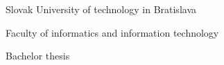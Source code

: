 \begin{center}
\thispagestyle{empty}
{\Large Slovak University of technology in Bratislava}
\par\end{center}{\Large \par}

\begin{center}
{\Large Faculty of informatics and information technology}
\par\end{center}{\Large \par}

\smallskip{}

\begin{center}
\myEvidenceNumber
\par\end{center}
\vfill{}

\begin{center}
\textbf{\Large \myName}
\par\end{center}{\Large \par}

\medskip{}


\begin{center}
\textbf{\LARGE \myTitleENG }
\par\end{center}{\huge \par}

\medskip{}


\begin{center}

{\Large Bachelor thesis}
\par\end{center}{\Large \par}

\vfill{}